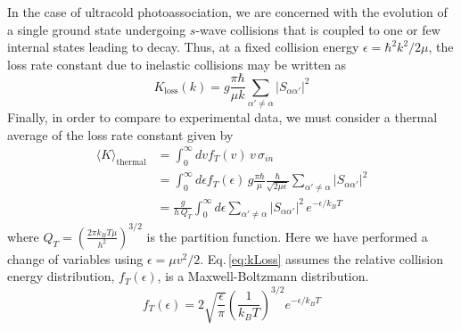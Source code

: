 In the case of ultracold photoassociation, we are concerned with the evolution of a single ground state undergoing $s$-wave collisions that is coupled to one or few internal states leading to decay.
Thus, at a fixed collision energy $\epsilon = \hbar^2 k^2 / 2\mu$, the loss rate constant due to inelastic collisions may be written as 
\begin{equation}
	K_{\text{loss}}(k) = g \frac{\pi \hbar}{\mu k} \sum_{\alpha' \neq \alpha}\vert S_{\alpha \alpha'} \vert^2
\end{equation}
Finally, in order to compare to experimental data, we must consider a thermal average of the loss rate constant given by \cite{Julienne2009, Julienne2009a, Krems2009a}
\begin{align} \label{eq:kLoss}
\nonumber
  \langle K \rangle_\text{thermal} &= \int_0^{\infty} dv f_T(v)\,v\,\sigma_{in} \\
  \nonumber
                                  &= \int_0^{\infty} d\epsilon  f_T(\epsilon)\, g \frac{\pi \hbar}{\mu} \frac{\hbar}{\sqrt{2 \mu \epsilon}} \sum_{\alpha' \neq \alpha}\vert S_{\alpha \alpha'} \vert^2 \\
                                  &= \frac{g}{h\,Q_{T}} \int_{0}^{\infty} d\epsilon \sum_{\alpha' \neq \alpha}\vert S_{\alpha \alpha'} \vert^2 \,e^{-\epsilon/k_{B}T}
\end{align}
where $Q_T=\left( \frac{2 \pi k_B T \mu}{h^2} \right)^{3/2}$ is the partition function.
Here we have performed a change of variables using $\epsilon = \mu v^2/2$.
Eq.\,\ref{eq:kLoss} assumes the relative collision energy distribution, $f_T(\epsilon)$, is a Maxwell-Boltzmann distribution.
\begin{equation}
	f_T(\epsilon) = 2 \sqrt{\frac{\epsilon}{\pi}} \left( \frac{1}{k_B T} \right)^{3/2} e^{-\epsilon/k_B T}
\end{equation}

